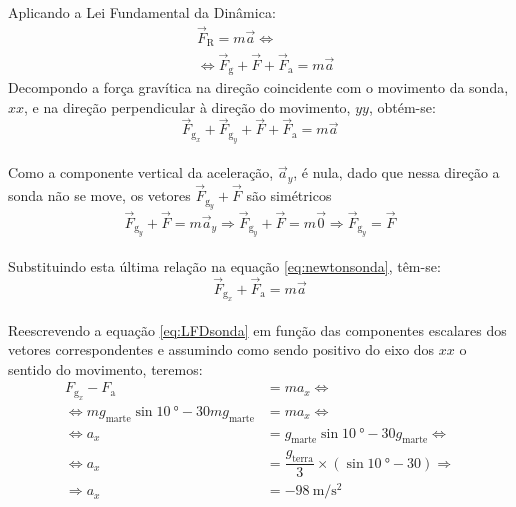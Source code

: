 \documentclass[addpoints]{exam}
\begin{document}
\begin{questions}
\begin{parts}
\begin{solution}
{					Aplicando a Lei Fundamental da Dinâmica:\\
					\begin{align*}
						&\vec{F}_\text{R} = m \vec{a} \Leftrightarrow \\
						&\Leftrightarrow \vec{F}_\text{g} + \vec{F} + \vec{F}_\text{a} = m \vec{a}
					\end{align*}
					Decompondo a força gravítica na direção coincidente com o movimento da sonda, $xx$, e na direção perpendicular à direção do movimento, $yy$, obtém-se:\\
					\begin{equation}
						\vec{F}_\text{g}_x + \vec{F}_\text{g}_y + \vec{F} + \vec{F}_\text{a} = m \vec{a}
						\label{eq:newtonsonda}
					\end{equation}
					\\
					Como a componente vertical da aceleração, $\vec{a}_y$, é nula, dado que nessa direção a sonda não se move, os vetores $\vec{F}_\text{g}_y + \vec{F}$ são simétricos\\
					$$\vec{F}_\text{g}_y + \vec{F} = m \vec{a}_y \Rightarrow \vec{F}_\text{g}_y + \vec{F} = m \vec{0} \Rightarrow \vec{F}_\text{g}_y = \vec{F}$$\\
					Substituindo esta última relação na equação \ref{eq:newtonsonda}, têm-se:\\
					\begin{equation}
						\vec{F}_\text{g}_x + \vec{F}_\text{a} = m \vec{a}
						\label{eq:LFDsonda}
					\end{equation}
					\\
					Reescrevendo a equação \ref{eq:LFDsonda} em função das componentes escalares dos vetores correspondentes e assumindo como sendo positivo do eixo dos $xx$ o sentido do movimento, teremos:\\
					\begin{align*}
						F_\text{g}_x - F_\text{a} &= m a_x \Leftrightarrow \\
						\Leftrightarrow m g_\text{marte} \sin \SI{10}{\degree} - 30 m g_\text{marte} &= m a_x \Leftrightarrow \\
						\Leftrightarrow a_x &= g_\text{marte} \sin \SI{10}{\degree} - 30 g_\text{marte} \Leftrightarrow \\
						\Leftrightarrow a_x &= \dfrac{g_\text{terra}}{3} \times (\sin \SI{10}{\degree} - 30) \Rightarrow \\
						\Rightarrow a_x &= \SI{-98}{\meter\per\second\squared}
					\end{align*}
					
}
\end{solution}
\end{parts}
\end{questions}
\end{document}
